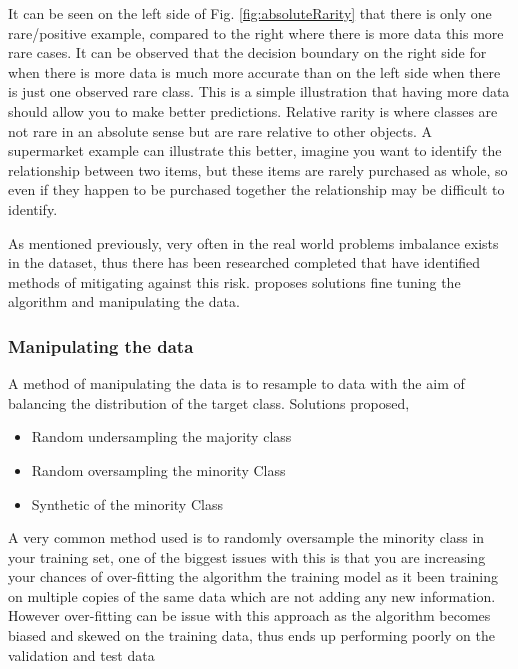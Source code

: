 It can be seen on the left side of Fig. \ref{fig:absoluteRarity} that there is only one rare/positive example, compared to the right where there is more data this more rare cases. It can be observed that the decision boundary on the right side for when there is more data is much more accurate than on the left side when there is just one observed rare class. This is a simple illustration that having more data should allow you to make better predictions. Relative rarity is where classes are not rare in an absolute sense but are rare relative to other objects. A supermarket example can illustrate this better, imagine you want to identify the relationship between two items, but these items are rarely purchased as whole, so even if they happen to be purchased together the relationship may be difficult to identify.

As mentioned previously, very often in the real world problems imbalance exists in the dataset, thus there has been researched completed that have identified methods of mitigating against this risk. \citep{chawla_editorial:_2004} proposes solutions fine tuning the algorithm and manipulating the data. 

\subsubsection{Manipulating the data}

A method of manipulating the data is to resample to data with the aim of balancing the distribution of the target class. Solutions proposed,

\begin{itemize}
	\item Random undersampling the majority class
	\item Random oversampling the minority Class
	\item Synthetic of the minority Class 
\end{itemize}

A very common method used is to randomly oversample the minority class in your training set, one of the biggest issues with this is that you are increasing your chances of over-fitting the algorithm the training model as it been training on multiple copies of the same data which are not adding any new information. However over-fitting can be issue with this approach as the algorithm becomes biased and skewed on the training data, thus ends up performing poorly on the validation and test data \cite[see][]{hawkins_problem_2004}

